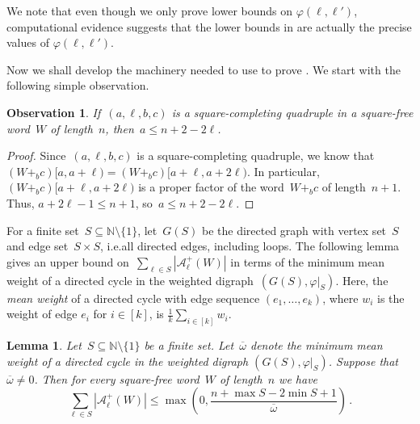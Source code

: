 \documentclass[12pt]{article}
\theoremstyle{plain}
\newtheorem{lemma}[theorem]{Lemma}
\newtheorem{observation}[theorem]{Observation}
\theoremstyle{definition}
\newcommand\N{\mathbb{N}}
\newcommand{\cA}{\mathcal A}
\newcommand{\f}{\varphi}
\newcommand{\w}{\f\vert_S}
\newcommand{\bw}{\overline \omega}
\newcommand{\subs}{\subseteq}
\newcommand{\sm}{\setminus}
\newcommand{\abs}[1]{\mathopen{}\left\lvert#1\right\rvert\mathclose{}}
\begin{document}
	We note that even though we only prove lower bounds on $\f(\ell,\ell')$, computational evidence suggests that the lower bounds in  are actually the precise values of $\f(\ell,\ell')$.
	
	Now we shall develop the machinery needed to use  to prove . We start with the following simple observation.
	
	\begin{observation} \label{obs:no-late-inserts}
		If~$(a,\ell,b,c)$ is a square-completing quadruple in a square-free word~$W$ of length~$n$, then~$a\le n+2-2\ell$.
	\end{observation}
	
	\begin{proof}
		Since~$(a,\ell,b,c)$ is a square-completing quadruple, we know that~$(W+_{b}c)[a,a+\ell)=(W+_{b}c)[a+\ell,a+2\ell)$. In particular, $(W+_{b}c)[a+\ell,a+2\ell)$ is a proper factor of the word~$W+_{b}c$ of length~$n+1$. Thus, $a+2\ell-1\le n+1$, so~$a\le n+2-2\ell$.
	\end{proof}
	
	For a finite set~$S\subs\N\sm\{1\}$, let~$G(S)$ be the directed graph with vertex set~$S$ and edge set~$S\times S$, i.e.\@ all directed edges, including loops. The following lemma gives an upper bound on~$\sum_{\ell\in S}\abs{\cA^{+}_\ell(W)}$ in terms of the minimum mean weight of a directed cycle in the weighted digraph~$(G(S),\w)$. Here, the \emph{mean weight} of a directed cycle with edge sequence $(e_1,\dots,e_k)$, where $w_i$ is the weight of edge $e_i$ for $i\in[k]$, is $\frac{1}{k}\sum_{i\in [k]}w_i$.
	
	\begin{lemma} \label{lem:bound-min-mean-weight-cycle}
		Let~$S\subs\N\sm\{1\}$ be a finite set. Let~$\bw$ denote the minimum mean weight of a directed cycle in the weighted digraph $(G(S),\w)$. Suppose that~$\bw\ne0$. Then for every square-free word~$W$ of length~$n$ we have
		\[ \sum_{\ell\in S}\abs{\cA^{+}_\ell(W)}\le \max\!\left(0,\frac{n+\max S-2\min S+1}{\bw}\right)\,. \]
	\end{lemma}
	
\end{document}
